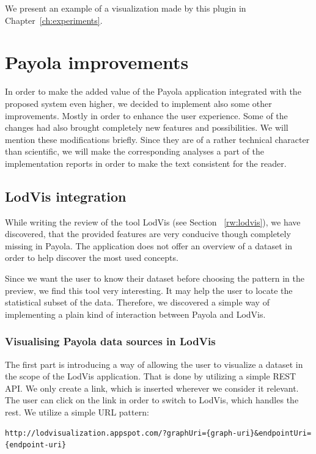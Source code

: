 We present an example of a visualization made by this plugin in 
Chapter~\ref{ch:experiments}.

\section{Payola improvements}
In order to make the added value of the Payola application integrated with the 
proposed system even higher, we decided to implement also some other
improvements. Mostly in order to enhance the user experience. Some of the changes
had also brought completely new features and possibilities. We will mention 
these modifications briefly. Since they are of a rather technical character 
than scientific, we will make the corresponding analyses a part of the 
implementation reports in order to make the text consistent for the reader.

\subsection{LodVis integration}
While writing the review of the tool LodVis (see Section ~\ref{rw:lodvis}), 
we have discovered, that the provided features are very conducive though completely 
missing in Payola. The application does not offer an overview of a dataset in order 
to help discover the most used concepts.

Since we want the user to know their dataset before choosing the pattern in the 
preview, we find this tool very interesting. It may help the user to locate the 
statistical subset of the data. Therefore, we discovered a simple way of 
implementing a plain kind of interaction between Payola and LodVis.

\subsubsection{Visualising Payola data sources in LodVis}
The first part is introducing a way of allowing the user to visualize a 
dataset in the scope of the LodVis application. That is done by utilizing a 
simple REST API. We only create a link, which is inserted wherever we consider it 
relevant. The user can click on the link in order to switch to LodVis,
which handles the rest. We utilize a simple URL pattern:

{  \scriptsize
\begin{verbatim}
http://lodvisualization.appspot.com/?graphUri={graph-uri}&endpointUri={endpoint-uri}
\end{verbatim}
}

